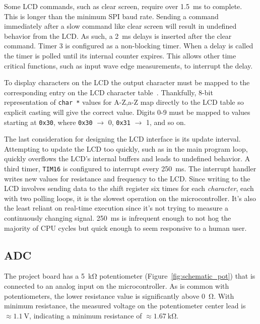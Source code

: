 Some LCD commands, such as clear screen, require over \SI{1.5}{\milli\second} to complete.
This is longer than the minimum SPI baud rate.
Sending a command immediately after a slow command like clear screen will result in undefined behavior from the LCD.
As such, a \SI{2}{\milli\second} delays is inserted after the clear command.
Timer 3 is configured as a non-blocking timer.
When a delay is called the timer is polled until its internal counter expires.
This allows other time critical functions, such as input wave edge measurements, to interrupt the delay.

To display characters on the LCD the output character must be mapped to the corresponding entry on the LCD character table~\cite[p. 17]{H:HD44780}.
Thankfully, 8-bit representation of \texttt{char *} values for A-Z,a-Z map directly to the LCD table so explicit casting will give the correct value.
Digits 0-9 must be mapped to values starting at \texttt{0x30}, where \texttt{0x30} $\rightarrow$ 0, \texttt{0x31} $\rightarrow$ 1, and so on.

The last consideration for designing the LCD interface is its update interval.
Attempting to update the LCD too quickly, such as in the main program loop, quickly overflows the LCD's internal buffers and leads to undefined behavior.
A third timer, \texttt{TIM16} is configured to interrupt every \SI{250}{\milli\second}.
The interrupt handler writes new values for resistance and frequency to the LCD.
Since writing to the LCD involves sending data to the shift register six times for each \textit{character}, each with two polling loops, it is the slowest operation on the microcontroller.
It's also the least reliant on real-time execution since it's not trying to measure a continuously changing signal. \SI{250}{\milli\second} is infrequent enough to not hog the majority of CPU cycles but quick enough to seem responsive to a human user.

\subsection{ADC}\label{sec:adc}
The project board has a \SI{5}{\kilo\ohm} potentiometer (Figure~\ref{fig:schematic_pot}) that is connected to an analog input on the microcontroller.
As is common with potentiometers, the lower resistance value is significantly above \SI{0}{\ohm}.
With minimum resistance, the measured voltage on the potentiometer center lead is $\approx \SI{1.1}{\volt}$, indicating a minimum resistance of $\approx \SI{1.67}{\kilo\ohm}$.

